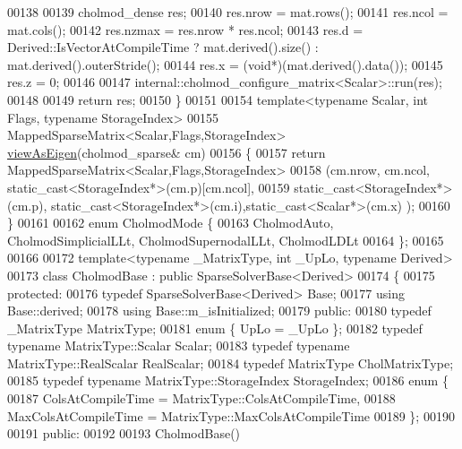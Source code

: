 \begin{DoxyCode}
00138 
00139   cholmod\_dense res;
00140   res.nrow   = mat.rows();
00141   res.ncol   = mat.cols();
00142   res.nzmax  = res.nrow * res.ncol;
00143   res.d      = Derived::IsVectorAtCompileTime ? mat.derived().size() : mat.derived().outerStride();
00144   res.x      = (\textcolor{keywordtype}{void}*)(mat.derived().data());
00145   res.z      = 0;
00146 
00147   internal::cholmod\_configure\_matrix<Scalar>::run(res);
00148 
00149   \textcolor{keywordflow}{return} res;
00150 \}
00151 
00154 \textcolor{keyword}{template}<\textcolor{keyword}{typename} Scalar, \textcolor{keywordtype}{int} Flags, \textcolor{keyword}{typename} StorageIndex>
00155 MappedSparseMatrix<Scalar,Flags,StorageIndex> \hyperlink{namespace_eigen_af13cf1742b9a7a03703e8e5393bb6f86}{viewAsEigen}(cholmod\_sparse& cm)
00156 \{
00157   \textcolor{keywordflow}{return} MappedSparseMatrix<Scalar,Flags,StorageIndex>
00158          (cm.nrow, cm.ncol, \textcolor{keyword}{static\_cast<}StorageIndex*\textcolor{keyword}{>}(cm.p)[cm.ncol],
00159           static\_cast<StorageIndex*>(cm.p), \textcolor{keyword}{static\_cast<}StorageIndex*\textcolor{keyword}{>}(cm.i),static\_cast<Scalar*>(cm.x) );
00160 \}
00161 
00162 \textcolor{keyword}{enum} CholmodMode \{
00163   CholmodAuto, CholmodSimplicialLLt, CholmodSupernodalLLt, CholmodLDLt
00164 \};
00165 
00166 
00172 \textcolor{keyword}{template}<\textcolor{keyword}{typename} \_MatrixType, \textcolor{keywordtype}{int} \_UpLo, \textcolor{keyword}{typename} Derived>
00173 \textcolor{keyword}{class }CholmodBase : \textcolor{keyword}{public} SparseSolverBase<Derived>
00174 \{
00175   \textcolor{keyword}{protected}:
00176     \textcolor{keyword}{typedef} SparseSolverBase<Derived> Base;
00177     \textcolor{keyword}{using} Base::derived;
00178     \textcolor{keyword}{using} Base::m\_isInitialized;
00179   \textcolor{keyword}{public}:
00180     \textcolor{keyword}{typedef} \_MatrixType MatrixType;
00181     \textcolor{keyword}{enum} \{ UpLo = \_UpLo \};
00182     \textcolor{keyword}{typedef} \textcolor{keyword}{typename} MatrixType::Scalar Scalar;
00183     \textcolor{keyword}{typedef} \textcolor{keyword}{typename} MatrixType::RealScalar RealScalar;
00184     \textcolor{keyword}{typedef} MatrixType CholMatrixType;
00185     \textcolor{keyword}{typedef} \textcolor{keyword}{typename} MatrixType::StorageIndex StorageIndex;
00186     \textcolor{keyword}{enum} \{
00187       ColsAtCompileTime = MatrixType::ColsAtCompileTime,
00188       MaxColsAtCompileTime = MatrixType::MaxColsAtCompileTime
00189     \};
00190 
00191   \textcolor{keyword}{public}:
00192 
00193     CholmodBase()

\end{DoxyCode}
